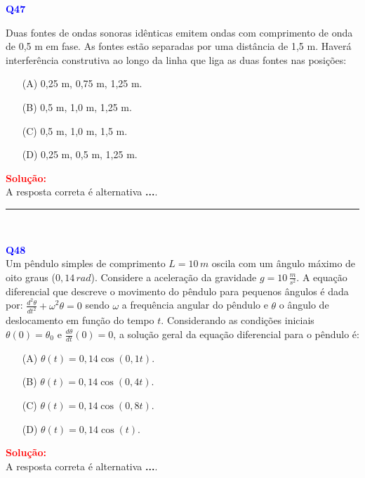 \documentclass[a4paper,12pt]{article}
\begin{document}
\begin{flushleft}
\textbf{\textcolor{blue}{\Large Q47}}\\
\noindent

Duas fontes de ondas sonoras idênticas emitem ondas com
comprimento de onda de 0,5 m em fase. As fontes estão
separadas por uma distância de 1,5 m. Haverá interferência
construtiva ao longo da linha que liga as duas fontes nas
posições:

\begin{itemize}
\item[(A)] 0,25 m, 0,75 m, 1,25 m.
\item[(B)] 0,5 m, 1,0 m, 1,25 m.
\item[(C)] 0,5 m, 1,0 m, 1,5 m.
\item[(D)] 0,25 m, 0,5 m, 1,25 m.
\end{itemize}

\vspace{0.5cm}

\textcolor{red}{\textbf{Solução:}}\\


A resposta correta é alternativa \colorbox{green!50}{\textbf{...}}.
\end{flushleft}

\noindent\rule{\linewidth}{0.6pt}\\

\begin{flushleft}
\textbf{\textcolor{blue}{\Large Q48}}\\
\noindent
Um pêndulo simples de comprimento \( L = 10\,m \) oscila com um ângulo máximo de oito graus (\( 0,14\,rad \)).  
Considere a aceleração da gravidade \( g = 10\,\frac{m}{s^2} \).  
A equação diferencial que descreve o movimento do pêndulo para pequenos ângulos é dada por:
$\frac{d^2\theta}{dt^2} + \omega^2 \theta = 0$ sendo \( \omega \) a frequência angular do pêndulo e \( \theta \) o ângulo de deslocamento em função do tempo \( t \).  
Considerando as condições iniciais \( \theta(0) = \theta_0 \) e \( \frac{d\theta}{dt}(0) = 0 \), a solução geral da equação diferencial para o pêndulo é:

\begin{itemize}
\item[(A)] \( \theta(t) = 0{,}14\cos(0{,}1t) \).
\item[(B)] \( \theta(t) = 0{,}14\cos(0{,}4t) \).
\item[(C)] \( \theta(t) = 0{,}14\cos(0{,}8t) \).
\item[(D)] \( \theta(t) = 0{,}14\cos(t) \).
\end{itemize}

\vspace{0.5cm}

\textcolor{red}{\textbf{Solução:}}\\


A resposta correta é alternativa \colorbox{green!50}{\textbf{...}}.
\end{flushleft}
\end{document}
